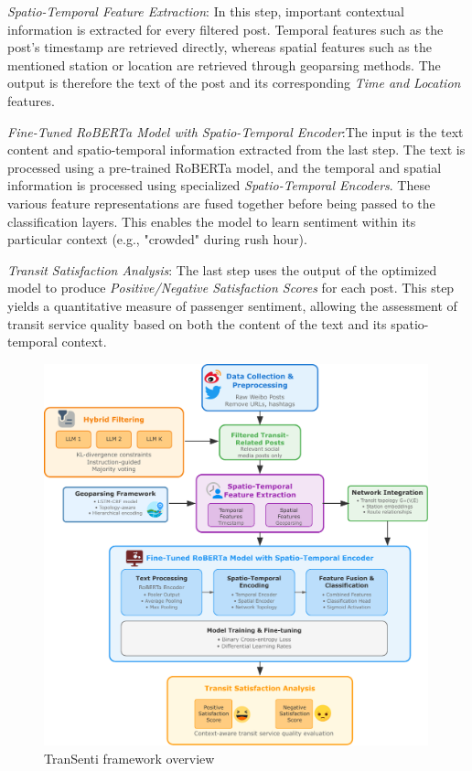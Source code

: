 \documentclass[a4paper,fleqn,12pt]{cas-sc}
\begin{document}
\textit{Spatio-Temporal Feature Extraction}: In this step, important contextual information is extracted for every filtered post. Temporal features such as the post's timestamp are retrieved directly, whereas spatial features such as the mentioned station or location are retrieved through geoparsing methods. The output is therefore the text of the post and its corresponding \textit{Time and Location} features.

\textit{Fine-Tuned RoBERTa Model with Spatio-Temporal Encoder}:The input is the text content and spatio-temporal information extracted from the last step. The text is processed using a pre-trained RoBERTa model, and the temporal and spatial information is processed using specialized \textit{Spatio-Temporal Encoders}. These various feature representations are fused together before being passed to the classification layers. This enables the model to learn sentiment within its particular context (e.g., "crowded" during rush hour).

\textit{Transit Satisfaction Analysis}: The last step uses the output of the optimized model to produce \textit{Positive/Negative Satisfaction Scores} for each post. This step yields a quantitative measure of passenger sentiment, allowing the assessment of transit service quality based on both the content of the text and its spatio-temporal context.

\begin{figure}[htbp]
\centering
\includegraphics[width=0.99\textwidth]{figs/new_flowchart.pdf}
\caption{TranSenti framework overview}\label{fig:overall_framework}
\end{figure} 
\end{document}
